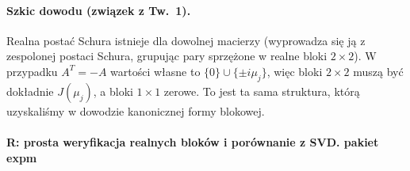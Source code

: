 \documentclass[12pt]{article}
\theoremstyle{plain}
\theoremstyle{remark}
\begin{document}
\paragraph{Szkic dowodu (związek z Tw.\ 1).}
Realna postać Schura istnieje dla dowolnej macierzy (wyprowadza się ją z zespolonej postaci Schura, grupując pary sprzężone w realne bloki $2\times2$). 
W przypadku $A^T=-A$ wartości własne to $\{0\}\cup\{\pm i\mu_j\}$, więc bloki $2\times2$ muszą być dokładnie $J(\mu_j)$, 
a bloki $1\times1$ zerowe. To jest ta sama struktura, którą uzyskaliśmy w dowodzie kanonicznej formy blokowej.

\paragraph{R: prosta weryfikacja realnych bloków i porównanie z SVD. pakiet expm}
\end{document}
